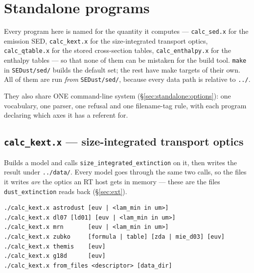 \documentclass{my_memo}
\newcommand{\code}[1]{\texttt{#1}}
\begin{document}
\section{Standalone programs}\label{sec:standalone}

Every program here is named for the quantity it computes --- \code{calc\_sed.x}
for the emission SED, \code{calc\_kext.x} for the size-integrated transport
optics, \code{calc\_qtable.x} for the stored cross-section tables,
\code{calc\_enthalpy.x} for the enthalpy tables --- so that none of them can be
mistaken for the build tool. \code{make} in \code{SEDust/sed/} builds the
default set; the rest have make targets of their own. All of them are run
\emph{from} \code{SEDust/sed/}, because every data path is relative to
\code{../}.

They also share ONE command-line system (\S\ref{sec:standalone:options}): one
vocabulary, one parser, one refusal and one filename-tag rule, with each program
declaring which axes it has a referent for.

\subsection{\code{calc\_kext.x} --- size-integrated transport optics}

Builds a model and calls \code{size\_integrated\_extinction} on it, then writes
the result under \code{../data/}. Every model goes through the same two calls,
so the files it writes \emph{are} the optics an RT host gets in memory --- these
are the files \code{dust\_extinction} reads back (\S\ref{sec:ext}).

\begin{lstlisting}[style=sh]
./calc_kext.x astrodust [euv | <lam_min in um>]
./calc_kext.x dl07 [ld01] [euv | <lam_min in um>]
./calc_kext.x mrn       [euv | <lam_min in um>]
./calc_kext.x zubko     [formula | table] [zda | mie_d03] [euv]
./calc_kext.x themis    [euv]
./calc_kext.x g18d      [euv]
./calc_kext.x from_files <descriptor> [data_dir]
\end{lstlisting}
\end{document}
